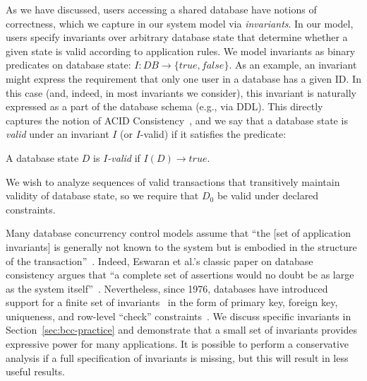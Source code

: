  As we have discussed, users accessing a shared
database have notions of correctness, which we capture in our system
model via \textit{invariants}. In our model, users specify invariants
over arbitrary database state that determine whether a given state is
valid according to application rules. We model invariants as binary
predicates on database state: $I: DB \rightarrow \{true, false\}$.  As
an example, an invariant might express the requirement that only one
user in a database has a given ID. In this case (and, indeed, in most
invariants we consider), this invariant is naturally expressed as a
part of the database schema (e.g., via DDL). This directly captures
the notion of ACID Consistency~\cite{bernstein-book,gray-virtues}, and
we say that a database state is \textit{valid} under an invariant $I$
(or $I$-valid) if it satisfies the predicate:

\begin{definition}
A database state $D$ is \textit{$I$-valid} if $I(D) \rightarrow true$.
\end{definition}

We wish to analyze sequences of valid transactions that transitively
maintain validity of database state, so we require that $D_0$ be valid
under declared constraints.

 Many database concurrency
control models assume that ``the [set of application invariants] is
generally not known to the system but is embodied in the structure of
the transaction''~\cite{traiger-tods}. Indeed, Eswaran et al.'s
classic paper on database consistency argues that ``a complete set of
assertions would no doubt be as large as the system
itself''~\cite{eswaran-consistency}. Nevertheless, since 1976,
databases have introduced support for a finite set of
invariants~\cite{korth-serializability,decomp-semantics,garciamolina-semantics,ic-survey,ic-survey-two}
in the form of primary key, foreign key, uniqueness, and row-level
``check'' constraints~\cite{kemme-si-ic}. We discuss specific
invariants in Section~\ref{sec:bcc-practice} and demonstrate that a
small set of invariants provides expressive power for many
applications. It is possible to perform a conservative analysis if a
full specification of invariants is missing, but this will result in
less useful results.\vspace{.5em}


